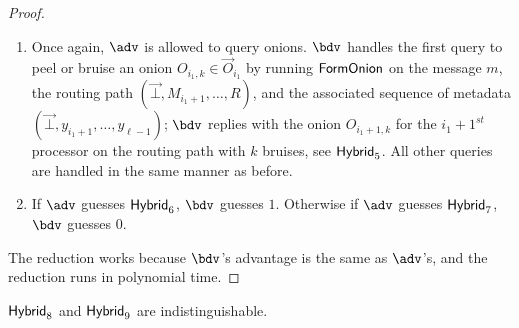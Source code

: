 \documentclass[runningheads,a4paper]{llncs}
\begin{document}
\begin{proof}
\begin{enumerate}
\item Once again, $\adv$ is allowed to query onions. $\bdv$ handles the first query to peel or bruise an onion $O_{i_1, k} \in \vec{O}_{i_1}$ by running $\mathsf{FormOnion}$ on the message $m$, the routing path $(\vec{\bot}, M_{i_1+1}, \dots, R)$, and the associated sequence of metadata $(\vec{\bot}, y_{i_1+1}, \dots, y_{\ell-1})$; $\bdv$ replies with the onion $O_{i_1+1, k}$ for the $i_1+1^\mathit{st}$ processor on the routing path with $k$ bruises, see $\mathsf{Hybrid}_{5}$. 
All other queries are handled in the same manner as before. 

\item If $\adv$ guesses $\mathsf{Hybrid}_{6}$, $\bdv$ guesses $1$. Otherwise if $\adv$ guesses $\mathsf{Hybrid}_{7}$, $\bdv$ guesses $0$. 
\end{enumerate}
The reduction works because $\bdv$'s advantage is the same as $\adv$'s, and the reduction runs in polynomial time. 
\end{proof}






\iffalse 
\begin{lemma}
$\mathsf{Hybrid}_{8}$ and $\mathsf{Hybrid}_{9}$ are indistinguishable. 
\end{lemma}
\end{document}
